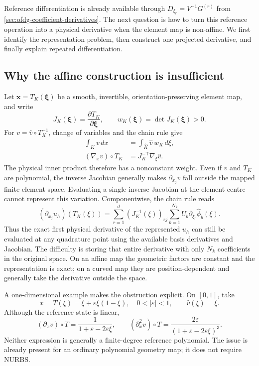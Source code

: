 Reference differentiation is already available through
$D_{\xi_r}=V^{-1}G^{(r)}$ from
\cref{sec:ofdg-coefficient-derivatives}. The next question is how to turn
this reference operation into a physical derivative when the element map is
non-affine. We first identify the representation problem, then construct
one projected derivative, and finally explain repeated differentiation.

\subsection{Why the affine construction is insufficient}
Let $\boldsymbol x=T_K(\boldsymbol\xi)$ be a smooth, invertible,
orientation-preserving element map, and write
\begin{equation}
 J_K(\boldsymbol\xi)=\frac{\partial T_K}{\partial\boldsymbol\xi},
 \qquad w_K(\boldsymbol\xi)=\det J_K(\boldsymbol\xi)>0.
 \label{eq:curved-jacobian}
\end{equation}
For $v=\widehat v\circ T_K^{-1}$, change of variables and the chain rule give
\begin{align}
 \int_K v\,dx&=\int_{\widehat K}\widehat v\,w_K\,d\xi,
 \label{eq:curved-change-variables}\\
 (\nabla_xv)\circ T_K&=J_K^{-\mathsf T}\nabla_\xi\widehat v.
 \label{eq:curved-chain-rule}
\end{align}
The physical inner product therefore has a nonconstant weight. Even if
$\widehat v$ and $T_K$ are polynomial, the inverse Jacobian generally makes
$\partial_{x_j}v$ fall outside the mapped finite element space. Evaluating a
single inverse Jacobian at the element centre cannot represent this variation.
Componentwise, the chain rule reads
\begin{equation}
 (\partial_{x_j}u_h)(T_K(\xi))
 =\sum_{r=1}^{d}(J_K^{-1}(\xi))_{rj}
                  \sum_{b=1}^{N_k}U_b\partial_{\xi_r}\widehat\phi_b(\xi).
\end{equation}
Thus the exact first physical derivative of the represented $u_h$ can still
be evaluated at any quadrature point using the available basis derivatives
and Jacobian. The difficulty is storing that entire derivative with only
$N_k$ coefficients in the original space. On an affine map the geometric
factors are constant and the representation is exact; on a curved map they
are position-dependent and generally take the derivative outside the space.

A one-dimensional example makes the obstruction explicit. On $[0,1]$, take
\begin{equation}
 x=T(\xi)=\xi+\varepsilon\xi(1-\xi),\quad
 0<|\varepsilon|<1,\qquad \widehat v(\xi)=\xi.
\end{equation}
Although the reference state is linear,
\begin{equation}
 (\partial_xv)\circ T=\frac{1}{1+\varepsilon-2\varepsilon\xi},\qquad
 (\partial_x^2v)\circ T=
 \frac{2\varepsilon}{(1+\varepsilon-2\varepsilon\xi)^3}.
 \label{eq:curved-derivative-example}
\end{equation}
Neither expression is generally a finite-degree reference polynomial. The
issue is already present for an ordinary polynomial geometry map; it does not
require NURBS.


